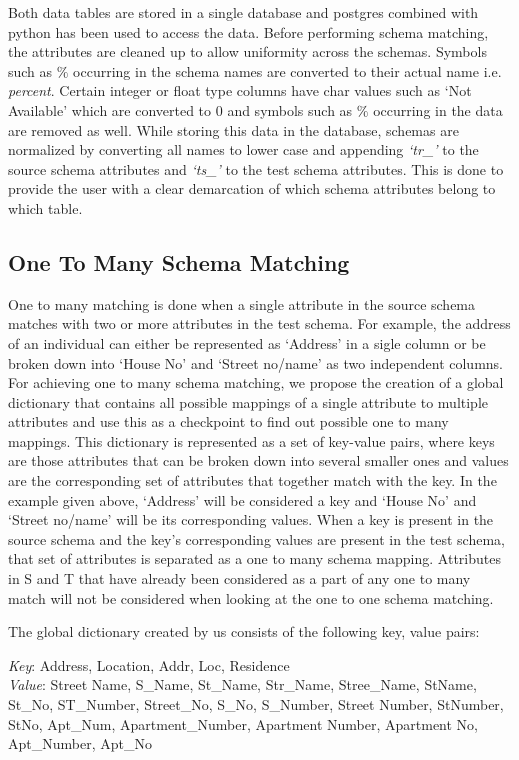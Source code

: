 \documentclass[conference]{IEEEtran}
\begin{document}
Both data tables are stored in a single database and postgres combined with python has been used to access the data. Before performing schema matching, the attributes are cleaned up to allow uniformity across the schemas. Symbols such as $\%$ occurring in the schema names are converted to their actual name i.e. \textit{percent}. Certain integer or float type columns have char values such as `Not Available' which are converted to 0 and symbols such as $\%$ occurring in the data are removed as well. While storing this data in the database, schemas are normalized by converting all names to lower case and appending \textit{`tr\_'} to the source schema attributes and \textit{`ts\_'} to the test schema attributes. This is done to provide the user with a clear demarcation of which schema attributes belong to which table.

\subsection{One To Many Schema Matching}
One to many matching is done when a single attribute in the source schema matches with two or more attributes in the test schema. For example, the address of an individual can either be represented as `Address' in a sigle column or be broken down into `House No' and `Street no/name' as two independent columns. For achieving one to many schema matching, we propose the creation of a global dictionary that contains all possible mappings of a single attribute to multiple attributes and use this as a checkpoint to find out possible one to many mappings. This dictionary is represented as a set of key-value pairs, where keys are those attributes that can be broken down into several smaller ones and values are the corresponding set of attributes that together match with the key. In the example given above, `Address' will be considered a key and `House No' and `Street no/name' will be its corresponding values. When a key is present in the source schema and the key's corresponding values are present in the test schema, that set of attributes is separated as a one to many schema mapping. Attributes in S and T that have already been considered as a part of any one to many match will not be considered when looking at the one to one schema matching. 

The global dictionary created by us consists of the following key, value pairs:

\noindent
\textit{Key}: Address, Location, Addr, Loc, Residence\\
\textit{Value}: Street Name, S\_Name, St\_Name, Str\_Name, Stree\_Name, StName, St\_No, ST\_Number, Street\_No, S\_No, S\_Number, Street Number, StNumber, StNo, Apt\_Num, Apartment\_Number, Apartment Number, Apartment No, Apt\_Number, Apt\_No
\end{document}
